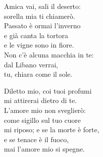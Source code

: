 
\strofa Amica vai, sali il deserto:\\
sorella mia ti chiamerò.\\
Passato è ormai l'inverno\\	
e già canta la tortora\\
e le vigne sono in fiore.\\
Non c'è alcuna macchia in te:\\
dal Libano verrai,\\
tu, chiara come il sole.

\spazio

\strofa Diletto mio, coi tuoi profumi\\
mi attirerai dietro di te.\\
L'amore mio non sveglierò:\\
come sigillo sul tuo cuore\\
mi riposo; e se la morte è forte,\\
e se tenace è il fuoco,\\
mai l'amore mio si spegne.
